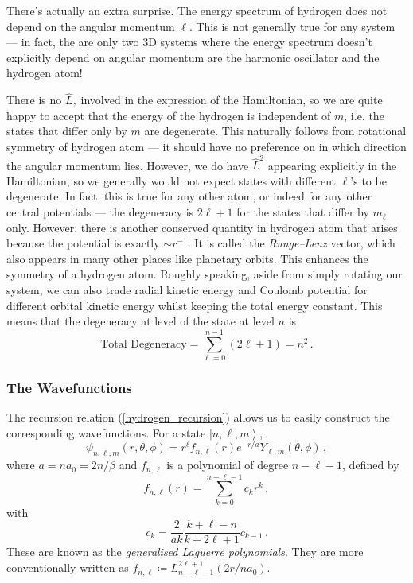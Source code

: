 \documentclass{article}
\theoremstyle{plain}\theoremheaderfont{\normalfont\itshape}\theorembodyfont{\rmfamily}\theoremseparator{.}\newtheorem*{rem}{Remark}\newtheorem*{ex}{Example}\newtheorem*{proof}{Proof}\newtheorem*{altp}{Alternative proof}
\theoremstyle{plain}\theoremheaderfont{\normalfont\bfseries}\theorembodyfont{\rmfamily}\theoremseparator{.}\newtheorem{thm}{Theorem}[section]\newtheorem{lem}[thm]{Lemma}\newtheorem{prop}[thm]{Proposition}\newtheorem*{cor}{Corollary}\newtheorem{defn}[thm]{Definition}\newtheorem{clm}[thm]{Claim}\newtheorem{clminproof}{Claim}
\theoremstyle{break}\theoremheaderfont{\normalfont\itshape}\theorembodyfont{\rmfamily}\theoremseparator{.\medskip}\newtheorem*{proofskip}{Proof}\newtheorem*{exs}{Examples}\newtheorem*{rems}{Remarks}
\theoremstyle{break}\theoremheaderfont{\normalfont\bfseries}\theorembodyfont{\rmfamily}\theoremseparator{.\medskip}\newtheorem{lemskip}[thm]{Lemma}\newtheorem{defnskip}[thm]{Definition}\newtheorem{propskip}[thm]{Proposition}\newtheorem{thmskip}[thm]{Theorem}
\numberwithin{equation}{section}
\newcommand{\ket}[1]{\left| #1 \right\rangle}
\begin{document}
    There's actually an extra surprise. The energy spectrum of hydrogen does not depend on the angular momentum \(\ell\). This is not generally true for any system --- in fact, the are only two 3D systems where the energy spectrum doesn't explicitly depend on angular momentum are the harmonic oscillator and the hydrogen atom!

    There is no \(\hat{L}_z\) involved in the expression of the Hamiltonian, so we are quite happy to accept that the energy of the hydrogen is independent of \(m\), i.e. the states that differ only by \(m\) are degenerate. This naturally follows from rotational symmetry of hydrogen atom --- it should have no preference on in which direction the angular momentum lies. However, we do have \(\hat{L}^2\) appearing explicitly in the Hamiltonian, so we generally would not expect states with different \(\ell\)'s to be degenerate. In fact, this is true for any other atom, or indeed for any other central potentials --- the degeneracy is \(2\ell+1\) for the states that differ by \(m_\ell\) only. However, there is another conserved quantity in hydrogen atom that arises because the potential is exactly \(\sim r^{-1}\). It is called the \textit{Runge--Lenz} vector, which also appears in many other places like planetary orbits. This enhances the symmetry of a hydrogen atom. Roughly speaking, aside from simply rotating our system, we can also trade radial kinetic energy and Coulomb potential for different orbital kinetic energy whilst keeping the total energy constant. This means that the degeneracy at level of the state at level \(n\) is
   \begin{equation}
        \text{Total Degeneracy}=\sum_{\ell=0}^{n-1}(2\ell+1)=n^2\,.
    \end{equation}

    \subsubsection{The Wavefunctions}
    The recursion relation (\ref{hydrogen_recursion}) allows us to easily construct the corresponding wavefunctions. For a state \(\ket{n,\ell,m}\),
   \begin{equation}
        \psi_{n,\ell,m}(r,\theta,\phi)=r^\ell f_{n,\ell}(r)e^{-r/a}Y_{\ell,m}(\theta,\phi)\,,
    \end{equation}
    where \(a=na_0=2n/\beta\) and \(f_{n,\ell}\) is a polynomial of degree \(n-\ell-1\), defined by
   \begin{equation}
        f_{n,\ell}(r)=\sum_{k=0}^{n-\ell-1}c_k r^k\,,
    \end{equation}
    with
   \begin{equation}
        c_k=\frac{2}{ak}\frac{k+\ell-n}{k+2\ell+1}c_{k-1}\,.
    \end{equation}
    These are known as the \textit{generalised Laguerre polynomials}. They are more conventionally written as \(f_{n,\ell}\coloneqq L_{n-\ell-1}^{2\ell+1}(2r/na_0)\).
\end{document}
